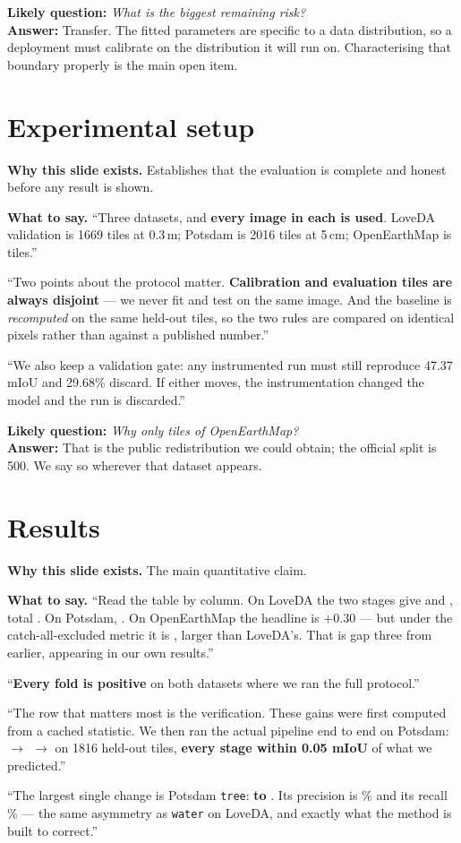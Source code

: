 \documentclass[11pt,a4paper]{article}
\newcommand{\best}[1]{\textcolor{acc}{\textbf{#1}}}
\newcommand{\why}[1]{\par\smallskip\noindent\textbf{Why this slide exists.} #1}
\newcommand{\say}[1]{\par\smallskip\noindent\textbf{What to say.} #1}
\newcommand{\ask}[2]{\par\smallskip\noindent\textbf{Likely question:} \emph{#1}\\
  \textbf{Answer:} #2}
\begin{document}
\ask{What is the biggest remaining risk?}{Transfer. The fitted parameters are
specific to a data distribution, so a deployment must calibrate on the
distribution it will run on. Characterising that boundary properly is the main
open item.}

\section{Experimental setup}
\why{Establishes that the evaluation is complete and honest before any result is
shown.}

\say{``Three datasets, and \best{every image in each is used}. LoveDA
validation is 1669 tiles at 0.3\,m; Potsdam is 2016 tiles at 5\,cm;
OpenEarthMap is \oemTiles{} tiles.''

\smallskip
``Two points about the protocol matter. \best{Calibration and evaluation tiles
are always disjoint} --- we never fit and test on the same image. And the
baseline is \emph{recomputed} on the same held-out tiles, so the two rules are
compared on identical pixels rather than against a published number.''

\smallskip
``We also keep a validation gate: any instrumented run must still reproduce
47.37 mIoU and 29.68\% discard. If either moves, the instrumentation changed the
model and the run is discarded.''}

\ask{Why only \oemTiles{} tiles of OpenEarthMap?}{That is the public
redistribution we could obtain; the official split is 500. We say so wherever
that dataset appears.}

\section{Results}
\why{The main quantitative claim.}

\say{``Read the table by column. On LoveDA the two stages give
\best{\methodGain{}} and \best{\scLove{}}, total \best{\loveTotal{}}. On Potsdam,
\best{\potsTotal{}}. On OpenEarthMap the headline is $+0.30$ --- but under the
catch-all-excluded metric it is \best{\mrOemReal{}}, larger than LoveDA's. That
is gap three from earlier, appearing in our own results.''

\smallskip
``\best{Every fold is positive} on both datasets where we ran the full protocol.''

\smallskip
``The row that matters most is the verification. These gains were first computed
from a cached statistic. We then ran the actual pipeline end to end on Potsdam:
\best{\eePotsA{} $\rightarrow$ \eePotsB{} $\rightarrow$ \eePotsC{}} on 1816
held-out tiles, \best{every stage within 0.05 mIoU} of what we predicted.''

\smallskip
``The largest single change is Potsdam \texttt{tree}: \best{\treeIoUa{} to
\treeIoUb{}}. Its precision is \treeP{}\% and its recall \treeR{}\% --- the same
asymmetry as \texttt{water} on LoveDA, and exactly what the method is built to
correct.''}
\end{document}

